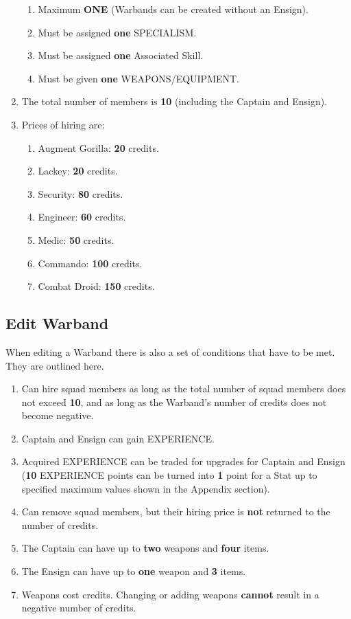 \documentclass[12pt,a4paper]{article}
\begin{document}
\begin{enumerate}
\begin{enumerate}
                \item Maximum \textbf{ONE} (Warbands can be created without an Ensign).
                \item Must be assigned \textbf{one} SPECIALISM.
                \item Must be assigned \textbf{one} Associated Skill.
                \item Must be given \textbf{one} WEAPONS/EQUIPMENT.
               \end{enumerate}
 \item The total number of members is \textbf{10} (including the Captain and Ensign).
 \item Prices of hiring are: \begin{enumerate}
                              \item Augment Gorilla: \textbf{20} credits.
                              \item Lackey: \textbf{20} credits.
                              \item Security: \textbf{80} credits.
                              \item Engineer: \textbf{60} credits.
                              \item Medic: \textbf{50} credits.
                              \item Commando: \textbf{100} credits.
                              \item Combat Droid: \textbf{150} credits.
                             \end{enumerate}
\end{enumerate}

\subsection{Edit Warband}

When editing a Warband there is also a set of conditions that have to be met. They are outlined here.

\begin{enumerate}
 \item Can hire squad members as long as the total number of squad members does not exceed \textbf{10}, and as long as the Warband's number of credits does not become negative.
 \item Captain and Ensign can gain EXPERIENCE.
 \item Acquired EXPERIENCE can be traded for upgrades for Captain and Ensign (\textbf{10} EXPERIENCE points can be turned into \textbf{1} point for a Stat up to specified maximum values shown in the Appendix section).
 \item Can remove squad members, but their hiring price is \textbf{not} returned to the number of credits.
 \item The Captain can have up to \textbf{two} weapons and \textbf{four} items.
 \item The Ensign can have up to \textbf{one} weapon and \textbf{3} items.
 \item Weapons cost credits. Changing or adding weapons \textbf{cannot} result in a negative number of credits.
\end{enumerate}
\end{document}
